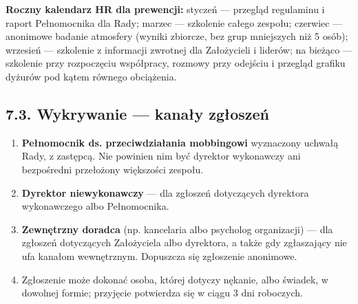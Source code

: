 \documentclass[11pt,a4paper]{report}
\begin{document}
\begin{DlaHR}
\textbf{Roczny kalendarz HR dla prewencji:} styczeń --- przegląd regulaminu i raport Pełnomocnika dla Rady; marzec --- szkolenie całego zespołu; czerwiec --- anonimowe badanie atmosfery (wyniki zbiorcze, bez grup mniejszych niż 5 osób); wrzesień --- szkolenie z informacji zwrotnej dla Założycieli i liderów; na bieżąco --- szkolenie przy rozpoczęciu współpracy, rozmowy przy odejściu i przegląd grafiku dyżurów pod kątem równego obciążenia.
\end{DlaHR}

\subsection*{7.3. Wykrywanie --- kanały zgłoszeń}
\begin{enumerate}
  \item \textbf{Pełnomocnik ds. przeciwdziałania mobbingowi} wyznaczony uchwałą Rady, z zastępcą. Nie powinien nim być dyrektor wykonawczy ani bezpośredni przełożony większości zespołu.
  \item \textbf{Dyrektor niewykonawczy} --- dla zgłoszeń dotyczących dyrektora wykonawczego albo Pełnomocnika.
  \item \textbf{Zewnętrzny doradca} (np. kancelaria albo psycholog organizacji) --- dla zgłoszeń dotyczących Założyciela albo dyrektora, a także gdy zgłaszający nie ufa kanałom wewnętrznym. Dopuszcza się zgłoszenie anonimowe.
  \item Zgłoszenie może dokonać osoba, której dotyczy nękanie, albo świadek, w dowolnej formie; przyjęcie potwierdza się w ciągu 3 dni roboczych.
\end{enumerate}
\end{document}
